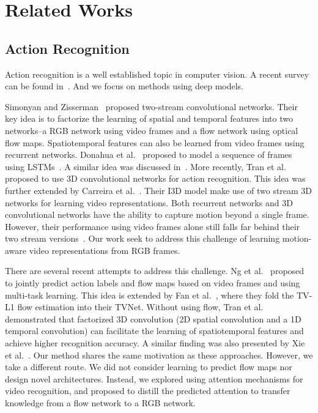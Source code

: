 \documentclass[10pt,twocolumn,letterpaper]{article}
\begin{document}
\section{Related Works}

\subsection{Action Recognition}
Action recognition is a well established topic in computer vision. A recent survey can be found in~\cite{poppe2010survey}. And we focus on methods using deep models. 

Simonyan and Zisserman~\cite{simonyan2014two} proposed two-stream convolutional networks. Their key idea is to factorize the learning of spatial and temporal features into two networks--a RGB network using video frames and a flow network using optical flow maps. Spatiotemporal features can also be learned from video frames using recurrent networks. Donahua et al.\ \cite{donahue2015long} proposed to model a sequence of frames using LSTMs~\cite{hochreiter1997long}. A similar idea was discussed in~\cite{yue2015beyond}. More recently, Tran et al.\ \cite{tran2015learning} proposed to use 3D convolutional networks for action recognition. This idea was further extended by Carreira et al.\ \cite{carreira2017quo}. Their I3D model make use of two stream 3D networks for learning video representations. Both recurrent networks and 3D convolutional networks have the ability to capture motion beyond a single frame. However, their performance using video frames alone still falls far behind their two stream versions~\cite{yue2015beyond,carreira2017quo}. Our work seek to address this challenge of learning motion-aware video representations from RGB frames.  

There are several recent attempts to address this challenge. Ng et al.\ \cite{ng2016actionflownet} proposed to jointly predict action labels and flow maps based on video frames and using multi-task learning. This idea is extended by Fan et al.\ \cite{fan2018end}, where they fold the TV-L1 flow estimation into their TVNet. Without using flow, Tran et al.\ \cite{Tran_2018_CVPR} demonstrated that factorized 3D convolution (2D spatial convolution and a 1D temporal convolution) can facilitate the learning of spatiotemporal features and achieve higher recognition accuracy. A similar finding was also presented by Xie et al.\ \cite{Xie_2018_ECCV}. Our method shares the same motivation as these approaches. However, we take a different route. We did not consider learning to predict flow maps nor design novel architectures. Instead, we explored using attention mechanisms for video recognition, and proposed to distill the predicted attention to transfer knowledge from a flow network to a RGB network.
\end{document}
